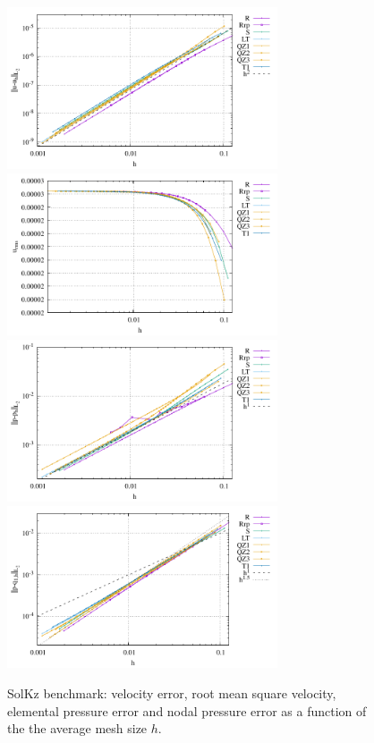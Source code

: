 \documentclass[a4paper]{article}
\begin{document}
\begin{figure}
\centering
\includegraphics[width=8cm]{../results/errors_u_exp5}
\includegraphics[width=8cm]{../results/vrms_exp5} \\
\includegraphics[width=8cm]{../results/errors_p_exp5}
\includegraphics[width=8cm]{../results/errors_q1_exp5}
\caption{SolKz benchmark: velocity error, 
root mean square velocity, elemental pressure error and nodal pressure error
as a function of the the average mesh size $h$.} 
\label{fig:ressolkz}
\end{figure}
\end{document}
